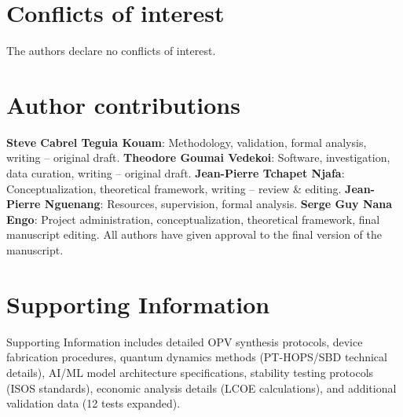 \documentclass[11pt,a4paper]{article}
\begin{document}
\section*{Conflicts of interest}

The authors declare no conflicts of interest.


\section*{Author contributions}

\textbf{Steve Cabrel Teguia Kouam}: Methodology, validation, formal analysis, writing -- original draft. \textbf{Theodore Goumai Vedekoi}: Software, investigation, data curation, writing -- original draft. \textbf{Jean-Pierre Tchapet Njafa}: Conceptualization, theoretical framework, writing -- review \& editing. \textbf{Jean-Pierre Nguenang}: Resources, supervision, formal analysis. \textbf{Serge Guy Nana Engo}: Project administration, conceptualization, theoretical framework, final manuscript editing. All authors have given approval to the final version of the manuscript.






\section*{Supporting Information}

Supporting Information includes detailed OPV synthesis protocols, device fabrication procedures, quantum dynamics methods (PT-HOPS/SBD technical details), AI/ML model architecture specifications, stability testing protocols (ISOS standards), economic analysis details (LCOE calculations), and additional validation data (12 tests expanded).

\end{document}
